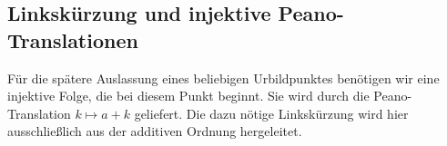 \documentclass[main.tex]{subfiles}
\begin{document}
\begin{tabproofsplitwide}
  \closeproofpartwideindR

  \closeproofpartwide
\end{tabproofsplitwide}

\subsection{Linkskürzung und injektive Peano-Translationen}

Für die spätere Auslassung eines beliebigen Urbildpunktes benötigen wir eine
injektive Folge, die bei diesem Punkt beginnt.  Sie wird durch die
Peano-Translation $k\mapsto a+k$ geliefert.  Die dazu nötige Linkskürzung
wird hier ausschließlich aus der additiven Ordnung hergeleitet.
\end{document}
